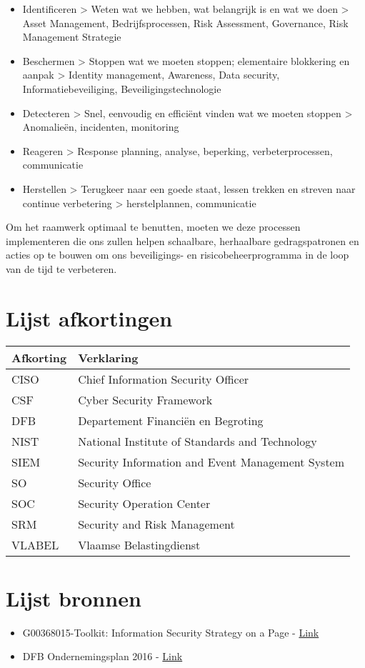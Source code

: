 \documentclass[11pt]{article}
\begin{document}
\begin{itemize}
\item Identificeren > Weten wat we hebben, wat belangrijk is en wat we doen > Asset Management, Bedrijfsprocessen, Risk Assessment, Governance, Risk Management Strategie
\item Beschermen > Stoppen wat we moeten stoppen; elementaire blokkering en aanpak > Identity management, Awareness, Data security, Informatiebeveiliging, Beveiligingstechnologie
\item Detecteren > Snel, eenvoudig en efficiënt vinden wat we moeten stoppen > Anomalieën, incidenten, monitoring
\item Reageren > Response planning, analyse, beperking, verbeterprocessen, communicatie
\item Herstellen > Terugkeer naar een goede staat, lessen trekken en streven naar continue verbetering > herstelplannen, communicatie
\end{itemize}

Om het raamwerk optimaal te benutten, moeten we deze processen implementeren die ons zullen helpen schaalbare, herhaalbare gedragspatronen en acties op te bouwen om ons beveiligings- en risicobeheerprogramma in de loop van de tijd te verbeteren.


\section{Lijst afkortingen}
\label{sec:orgd2351cc}
\begin{center}
\begin{tabular}{ll}
\hline
Afkorting & Verklaring\\
\hline
CISO & Chief Information Security Officer\\
CSF & Cyber Security Framework\\
DFB & Departement Financiën en Begroting\\
NIST & National Institute of Standards and Technology\\
SIEM & Security Information and Event Management System\\
SO & Security Office\\
SOC & Security Operation Center\\
SRM & Security and Risk Management\\
VLABEL & Vlaamse Belastingdienst\\
\hline
\end{tabular}
\end{center}


\section{Lijst bronnen}
\label{sec:orga7f4289}

\begin{itemize}
\item G00368015-Toolkit: Information Security Strategy on a Page - \href{https://www.gartner.com/document/3892398?ref=cust\_reco\_sdemail\&docType=RESEARCH}{Link}
\item DFB Ondernemingsplan 2016 - \href{http://fb.vonet.be/organisatie/departement-fb/ondernemingsplan}{Link}
\end{itemize}
\end{document}
